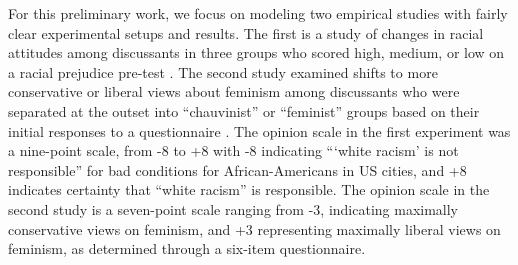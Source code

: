 \documentclass[a4paper,12pt]{article}
\begin{document}
For this preliminary work, we focus on modeling two empirical studies with
fairly clear experimental setups and results. 
The first is a study of changes in racial attitudes among
discussants in three groups who scored high, medium, or low on a racial prejudice
pre-test \cite{Myers1970}. The second study examined shifts to more conservative
or liberal views about feminism among discussants who were separated at the outset 
into ``chauvinist'' or ``feminist'' groups based on their initial responses to
a questionnaire \cite{Myers1975a}. 
The opinion scale in 
the first experiment was a nine-point scale, from -8 to +8 with -8 indicating 
```white racism' is not responsible'' for bad conditions for African-Americans
in US cities, and +8 indicates certainty that ``white racism'' is responsible.
The opinion scale in the second study is a seven-point scale ranging from -3,
indicating maximally conservative views on feminism, and +3 representing
maximally liberal views on feminism, as determined through a six-item
questionnaire. 
\end{document}
